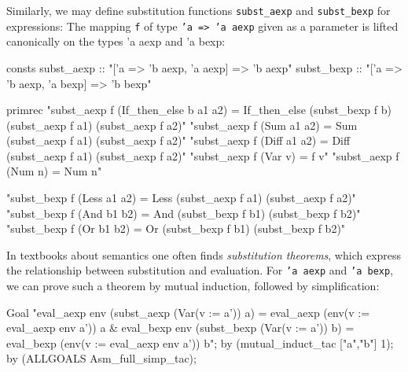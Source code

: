 Similarly, we may define substitution functions \texttt{subst_aexp}
and \texttt{subst_bexp} for expressions: The mapping \texttt{f} of type
\texttt{'a => 'a aexp} given as a parameter is lifted canonically
on the types {'a aexp} and {'a bexp}:
\begin{ttbox}
consts
  subst_aexp :: "['a => 'b aexp, 'a aexp] => 'b aexp"
  subst_bexp :: "['a => 'b aexp, 'a bexp] => 'b bexp"

primrec
  "subst_aexp f (If_then_else b a1 a2) =
     If_then_else (subst_bexp f b) (subst_aexp f a1) (subst_aexp f a2)"
  "subst_aexp f (Sum a1 a2) = Sum (subst_aexp f a1) (subst_aexp f a2)"
  "subst_aexp f (Diff a1 a2) = Diff (subst_aexp f a1) (subst_aexp f a2)"
  "subst_aexp f (Var v) = f v"
  "subst_aexp f (Num n) = Num n"

  "subst_bexp f (Less a1 a2) = Less (subst_aexp f a1) (subst_aexp f a2)"
  "subst_bexp f (And b1 b2) = And (subst_bexp f b1) (subst_bexp f b2)"
  "subst_bexp f (Or b1 b2) = Or (subst_bexp f b1) (subst_bexp f b2)"
\end{ttbox}
In textbooks about semantics one often finds {\em substitution theorems},
which express the relationship between substitution and evaluation. For
\texttt{'a aexp} and \texttt{'a bexp}, we can prove such a theorem by mutual
induction, followed by simplification:
\begin{ttbox}
Goal
  "eval_aexp env (subst_aexp (Var(v := a')) a) =
     eval_aexp (env(v := eval_aexp env a')) a &
   eval_bexp env (subst_bexp (Var(v := a')) b) =
     eval_bexp (env(v := eval_aexp env a')) b";
by (mutual_induct_tac ["a","b"] 1);
by (ALLGOALS Asm_full_simp_tac);
\end{ttbox}

